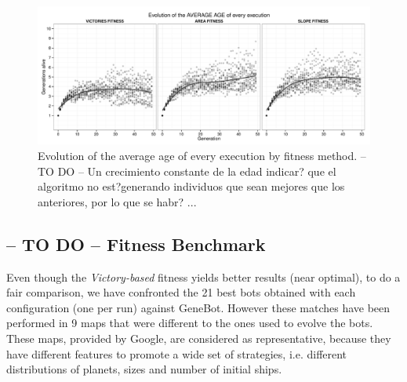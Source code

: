 \documentclass[preprint]{elsarticle}
\begin{document}
 \begin{figure}[ht]
 \begin{center}
   \includegraphics[width=12cm]{nuevas_imgs/evolution_AVERAGE_AGE.pdf}
 \end{center}
 \caption{Evolution of the average age of every execution by fitness
   method. -- TO DO -- Un crecimiento constante de la edad indicar?
   que el algoritmo no est?generando individuos que sean mejores que
   los anteriores, por lo que se habr? ...} %
 \label{figura:evolutionAGE}
 \end{figure}

\begin{table}
\end{table}

\subsection{-- TO DO -- Fitness Benchmark}

Even though the \textit{Victory-based} fitness yields better results
(near optimal), to do a fair comparison, we have confronted the 21
best bots obtained with each configuration (one per run) against
GeneBot. However these matches have been performed in 9 maps that were
different to the ones used to evolve the bots. These %
maps, provided by Google, are considered as representative, because they have different features to promote a wide set of strategies, i.e. different distributions of planets, sizes and number of initial ships. 
\end{document}
